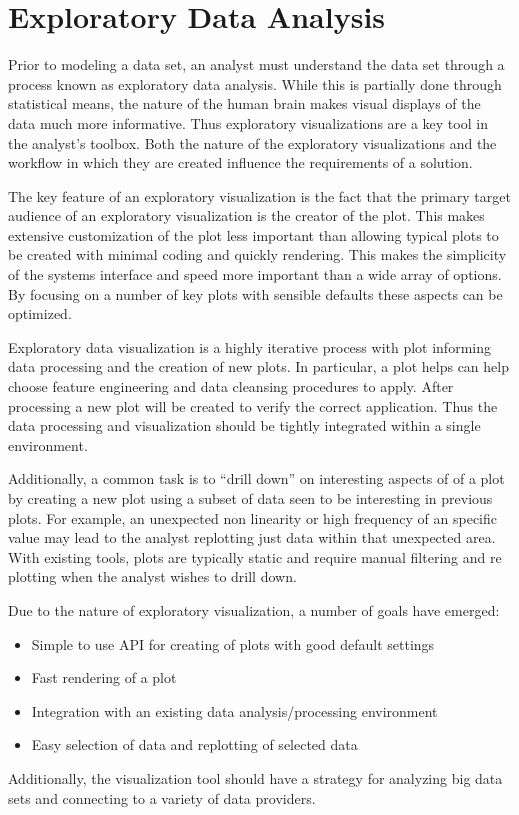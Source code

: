 \documentclass[letter,twocolumn]{article}
\begin{document}
\section{Exploratory Data Analysis}

Prior to modeling a data set, an analyst must understand the data set through a process known as exploratory data analysis.
While this is partially done through statistical means, the nature of the human brain makes visual displays of the data much more informative.
Thus exploratory visualizations are a key tool in the analyst's toolbox.   
Both the nature of the exploratory visualizations and the workflow in which they are created influence the requirements of a solution.

The key feature of an exploratory visualization is the fact that the primary target audience of an exploratory visualization is the creator of the plot.
This makes extensive customization of the plot less important than allowing typical plots to be created with minimal coding and quickly rendering.
This makes the simplicity of the systems interface and speed more important than a wide array of options.
By focusing on a number of key plots with sensible defaults these aspects can be optimized.

Exploratory data visualization is a highly iterative process with plot informing data processing and the creation of new plots.
In particular, a plot helps can help choose feature engineering and data cleansing procedures to apply.
After processing a new plot will be created to verify the correct application.
Thus the data processing and visualization should be tightly integrated within a single environment.

Additionally, a common task is to ``drill down'' on interesting aspects of of a plot by creating a new plot using a subset of data seen to be interesting in previous plots.
For example, an unexpected non linearity or high frequency of an specific value may lead to the analyst replotting just data within that unexpected area.
With existing tools, plots are typically static and require manual filtering and re plotting when the analyst wishes to drill down.  

Due to the nature of exploratory visualization, a number of goals have emerged:
\begin{itemize}
	\item Simple to use API for creating of plots with good default settings
	\item Fast rendering of a plot
	\item Integration with an existing data analysis/processing environment
	\item Easy selection of data and replotting of selected data
\end{itemize}
Additionally, the visualization tool should have a strategy for analyzing big data sets and connecting to a variety of data providers.
\end{document}
